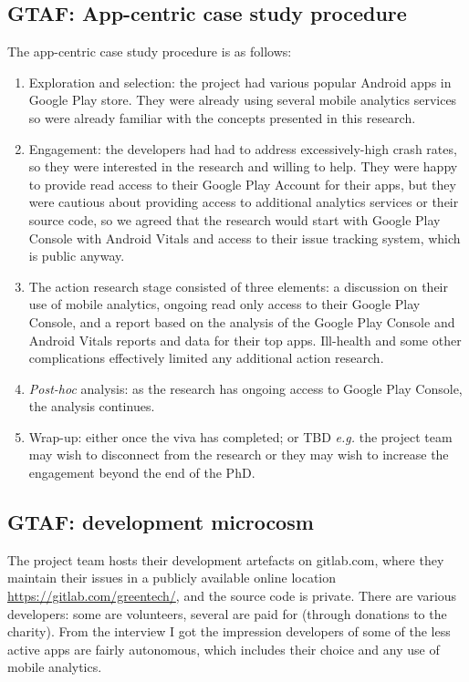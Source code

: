 \subsection{GTAF: App-centric case study procedure}
The app-centric case study procedure is as follows:
{\small
\begin{enumerate}
    \itemsep0em
    \item Exploration and selection: the project had various popular Android apps in Google Play store. They were already using several mobile analytics services so were already familiar with the concepts presented in this research.
    \item Engagement: the developers had had to address excessively-high crash rates, so they were interested in the research and willing to help. They were happy to provide read access to their Google Play Account for their apps, but they were cautious about providing access to additional analytics services or their source code, so we agreed that the research would start with Google Play Console with Android Vitals and access to their issue tracking system, which is public anyway.
    \item The action research stage consisted of three elements: a discussion on their use of mobile analytics, ongoing read only access to their Google Play Console, and a report based on the analysis of the Google Play Console and Android Vitals reports and data for their top apps. Ill-health and some other complications effectively limited any additional action research. 
    \item \textit{Post-hoc} analysis: as the research has ongoing access to Google Play Console, the analysis continues.
    \item Wrap-up: either once the viva has completed; or TBD \textit{e.g.} the project team may wish to disconnect from the research or they may wish to increase the engagement beyond the end of the PhD.
\end{enumerate}
}


\subsection{GTAF: development microcosm} 
The project team hosts their development artefacts on gitlab.com, where they maintain their issues in a publicly available online location \url{https://gitlab.com/greentech/}, and the source code is private. There are various developers: some are volunteers, several are paid for (through donations to the charity). From the interview I got the impression developers of some of the less active apps are fairly autonomous, which includes their choice and any use of mobile analytics. 


